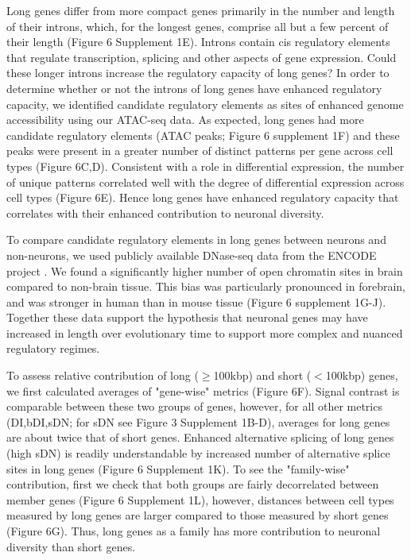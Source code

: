 Long genes differ from more compact genes primarily in the number and length of their introns, which, for the longest genes, comprise all but a few percent of their length (Figure 6 Supplement 1E). Introns contain cis regulatory elements that regulate transcription, splicing and other aspects of gene expression\citep{Rebollo_2012,Friedli_2015}. Could these longer introns increase the regulatory capacity of long genes? In order to determine whether or not the introns of long genes have enhanced regulatory capacity, we identified candidate regulatory elements as sites of enhanced genome accessibility using our ATAC-seq data. As expected, long genes had more candidate regulatory elements (ATAC peaks; Figure 6 supplement 1F) and these peaks were present in a greater number of distinct patterns per gene across cell types (Figure 6C,D). Consistent with a role in differential expression, the number of unique patterns correlated well with the degree of differential expression across cell types (Figure 6E). Hence long genes have enhanced regulatory capacity that correlates with their enhanced contribution to neuronal diversity.

To compare candidate regulatory elements in long genes between neurons and non-neurons, we used publicly available DNase-seq data from the ENCODE project \citep{Dunham_2012}. We found a significantly higher number of open chromatin sites in brain compared to non-brain tissue. This bias was particularly pronounced in forebrain, and was stronger in human than in mouse tissue (Figure 6 supplement 1G-J). Together these data support the hypothesis that neuronal genes may have increased in length over evolutionary time to support more complex and nuanced regulatory regimes. 

To assess relative contribution of long ($\geq$100kbp) and short ($<$100kbp) genes, we first calculated averages of "gene-wise" metrics (Figure 6F). Signal contrast is comparable between these two groups of genes, however, for all other metrics (DI,bDI,sDN; for sDN see Figure 3 Supplement 1B-D), averages for long genes are about twice that of short genes. Enhanced alternative splicing of long genes (high sDN) is readily understandable by increased number of alternative splice sites in long genes (Figure 6 Supplement 1K). To see the "family-wise" contribution, first we check that both groups are fairly decorrelated between member genes (Figure 6 Supplement 1L), however, distances between cell types measured by long genes are larger compared to those measured by short genes (Figure 6G). Thus, long genes as a family has more contribution to neuronal diversity than short genes. 








